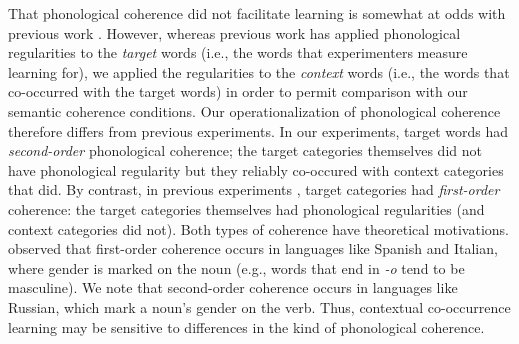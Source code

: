 \documentclass[man,floatsintext]{apa6}
\begin{document}
That phonological coherence did not facilitate learning is somewhat at odds with previous work \citep{frigo1998, monaghan2005, lany2010}. However, whereas previous work has applied phonological regularities to the \emph{target} words (i.e., the words that experimenters measure learning for), we applied the regularities to the \emph{context} words (i.e., the words that co-occurred with the target words) in order to permit comparison with our semantic coherence conditions. Our operationalization of phonological coherence therefore differs from previous experiments. In our experiments, target words had \emph{second-order} phonological coherence; the target categories themselves did not have phonological regularity but they reliably co-occured with context categories that did. By contrast, in previous experiments \citet{lany2010}, target categories had \emph{first-order} coherence: the target categories themselves had phonological regularities (and context categories did not). Both types of coherence have theoretical motivations. \citet{braine1987} observed that first-order coherence occurs in languages like Spanish and Italian, where gender is marked on the noun (e.g., words that end in \emph{-o} tend to be masculine). We note that second-order coherence occurs in languages like Russian, which mark a noun's gender on the verb. Thus, contextual co-occurrence learning may be sensitive to differences in the kind of phonological coherence.

\end{document}

